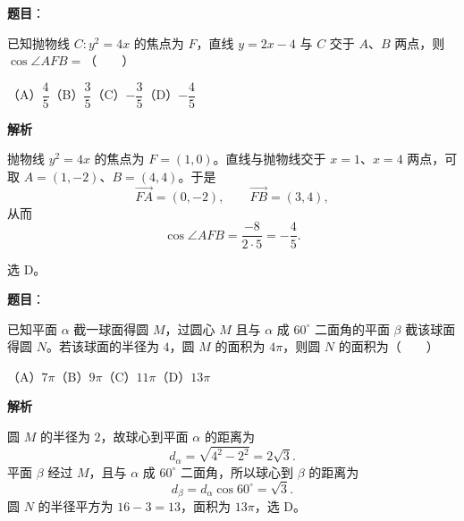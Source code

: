 \begin{answer}

\textbf{题目}：

已知抛物线 $C:y^2=4x$ 的焦点为 $F$，直线 $y=2x-4$ 与 $C$ 交于 $A\text{、}B$ 两点，则 $\cos\angle AFB=$\mbox{（　　）}

（A）$\dfrac45$\quad（B）$\dfrac35$\quad（C）$-\dfrac35$\quad（D）$-\dfrac45$

\textbf{解析}

抛物线 $y^2=4x$ 的焦点为 $F=(1,0)$。直线与抛物线交于
$x=1$、$x=4$ 两点，可取
$A=(1,-2)$、$B=(4,4)$。于是
\nopagebreak[4]
\[
\overrightarrow{FA}=(0,-2),\qquad
\overrightarrow{FB}=(3,4),
\]
从而
\nopagebreak[4]
\[
\cos\angle AFB
=\frac{-8}{2\cdot5}=-\frac45.
\]

选 D。


\end{answer}
\begin{answer}

\textbf{题目}：

已知平面 $\alpha$ 截一球面得圆 $M$，过圆心 $M$ 且与 $\alpha$ 成 $60^\circ$ 二面角的平面 $\beta$ 截该球面得圆 $N$。若该球面的半径为 $4$，圆 $M$ 的面积为 $4\pi$，则圆 $N$ 的面积为\mbox{（　　）}

（A）$7\pi$\quad（B）$9\pi$\quad（C）$11\pi$\quad（D）$13\pi$

\textbf{解析}

圆 $M$ 的半径为 $2$，故球心到平面 $\alpha$ 的距离为
\nopagebreak[4]
\[
d_\alpha=\sqrt{4^2-2^2}=2\sqrt3.
\]
平面 $\beta$ 经过 $M$，且与 $\alpha$ 成 $60^\circ$ 二面角，所以球心到
$\beta$ 的距离为
\nopagebreak[4]
\[
d_\beta=d_\alpha\cos60^\circ=\sqrt3.
\]
圆 $N$ 的半径平方为 $16-3=13$，面积为 $13\pi$，选 D。


\end{answer}
